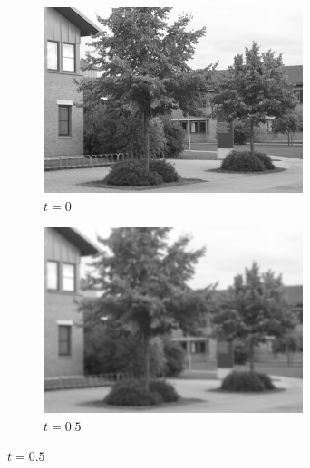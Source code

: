 \documentclass[a4paper,12pt]{article}
\begin{document}
\begin{figure}[h]
    \centering

    \begin{subfigure}[b]{0.4\linewidth}
    \includegraphics[width=\linewidth]{Scalespace0.png}
    \caption{$t=0$}
    \end{subfigure}
    \begin{subfigure}[b]{0.4\linewidth}
    \includegraphics[width=\linewidth]{Scalespace1.png}
    \caption{$t=0.5$}
    \end{subfigure}


\end{figure}
\end{document}
